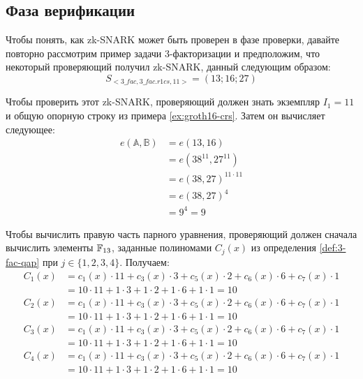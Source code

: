 \subsection{Фаза верификации}
Чтобы понять, как zk-SNARK может быть проверен в фазе проверки, давайте повторно рассмотрим пример задачи 3-факторизации и предположим, что некоторый проверяющий получил zk-SNARK, данный следующим образом:
\begin{equation}
S_{<3\_fac,3\_fac.r1cs,11>} = (13; 16; 27)
\end{equation}

Чтобы проверить этот zk-SNARK, проверяющий должен знать экземпляр $I_1=11$ и общую опорную строку из примера \ref{ex:groth16-crs}. Затем он вычисляет следующее:
\begin{align*}
e(\mathbb{A},\mathbb{B}) & = e(13,16) \\
                           & = e(38^{11},27^{11})\\
                           & = e(38,27)^{11\cdot 11}\\
                           & = e(38,27)^{4}\\
                           & = 9^4 = 9
\end{align*}

Чтобы вычислить правую часть парного уравнения, проверяющий должен сначала вычислить элементы $\mathbb{F}_{13}$, заданные полиномами $C_j(x)$ из определения \ref{def:3-fac-qap} при $j\in \{1,2,3,4\}$. Получаем:
\begin{align*}
C_1(x) & = c_1(x)\cdot 11 + c_3(x)\cdot 3 + c_5(x)\cdot 2 + c_6(x)\cdot 6 + c_7(x)\cdot 1 \\
       & = 10\cdot 11 + 1\cdot 3 + 1\cdot 2 + 1\cdot 6 + 1\cdot 1 = 10\\
C_2(x) & = c_1(x)\cdot 11 + c_3(x)\cdot 3 + c_5(x)\cdot 2 + c_6(x)\cdot 6 + c_7(x)\cdot 1 \\
       & = 10\cdot 11 + 1\cdot 3 + 1\cdot 2 + 1\cdot 6 + 1\cdot 1 = 10\\
C_3(x) & = c_1(x)\cdot 11 + c_3(x)\cdot 3 + c_5(x)\cdot 2 + c_6(x)\cdot 6 + c_7(x)\cdot 1 \\
       & = 10\cdot 11 + 1\cdot 3 + 1\cdot 2 + 1\cdot 6 + 1\cdot 1 = 10\\
C_4(x) & = c_1(x)\cdot 11 + c_3(x)\cdot 3 + c_5(x)\cdot 2 + c_6(x)\cdot 6 + c_7(x)\cdot 1 \\
       & = 10\cdot 11 + 1\cdot 3 + 1\cdot 2 + 1\cdot 6 + 1\cdot 1 = 10
\end{align*}

